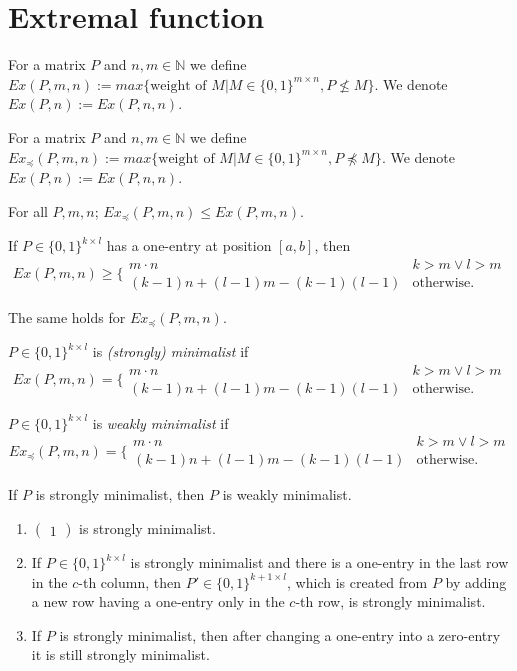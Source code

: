 \documentclass[12pt,a4paper]{report}
\let\openright=\clearpage
\begin{document}
\section{Extremal function}
\begin{defn}
For a matrix $P$ and $n,m\in\mathbb{N}$ we define $Ex(P,m,n):=max\{\text{weight of }M|M\in\{0,1\}^{m\times n},P\not\leq M\}$. We denote $Ex(P,n):=Ex(P,n,n)$.
\end{defn}
\begin{defn}
For a matrix $P$ and $n,m\in\mathbb{N}$ we define $Ex_{\preceq}(P,m,n):=max\{\text{weight of }M|M\in\{0,1\}^{m\times n},P\not\preceq M\}$. We denote $Ex(P,n):=Ex(P,n,n)$.
\end{defn}
\begin{obs}
For all $P,m,n$; $Ex_{\preceq}(P,m,n)\leq Ex(P,m,n)$.
\end{obs}
\begin{obs}
If $P\in\{0,1\}^{k\times l}$ has a one-entry at position $[a,b]$, then $$Ex(P,m,n)\geq\Big\{\begin{array}{ll}
m\cdot n & k>m\vee l>m \\
(k-1)n+(l-1)m-(k-1)(l-1) & \text{otherwise.}
\end{array}$$
\end{obs}
\begin{obs}
The same holds for $Ex_{\preceq}(P,m,n).$
\end{obs}
\begin{defn}
$P\in\{0,1\}^{k\times l}$ is \emph{(strongly) minimalist} if
$$Ex(P,m,n)=\Big\{\begin{array}{ll}
m\cdot n & k>m\vee l>m \\
(k-1)n+(l-1)m-(k-1)(l-1) & \text{otherwise.}
\end{array}$$
\end{defn}
\begin{defn}
$P\in\{0,1\}^{k\times l}$ is \emph{weakly minimalist} if
$$Ex_{\preceq}(P,m,n)=\Big\{\begin{array}{ll}
m\cdot n & k>m\vee l>m \\
(k-1)n+(l-1)m-(k-1)(l-1) & \text{otherwise.}
\end{array}$$
\end{defn}
\begin{obs}
If $P$ is strongly minimalist, then $P$ is weakly minimalist.
\end{obs}
\begin{fct}
\begin{enumerate}
\item $\left(\begin{smallmatrix}1\end{smallmatrix}\right)$ is strongly minimalist.
\item If $P\in\{0,1\}^{k\times l}$ is strongly minimalist and there is a one-entry in the last row in the $c$-th column, then $P'\in\{0,1\}^{k+1\times l}$, which is created from $P$ by adding a new row having a one-entry only in the $c$-th row, is strongly minimalist.
\item If $P$ is strongly minimalist, then after changing a one-entry into a zero-entry it is still strongly minimalist.
\end{enumerate}
\end{fct}

\openright
\end{document}

